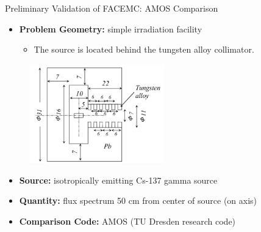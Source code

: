 \documentclass{beamer}
\begin{document}
\begin{frame}{Preliminary Validation of FACEMC: AMOS Comparison}

  \begin{itemize}
    \item \textbf{Problem Geometry:} simple irradiation facility
      \begin{itemize}
        \item The source is located behind the tungsten alloy collimator.
      \end{itemize}
  \end{itemize}

  \begin{figure}[h!]
    \begin{center}
      \includegraphics[width=2.3in]{figures/Irradiator_Facility.png}
    \end{center}
  \end{figure}

  \begin{itemize}
    \item \textbf{Source:} isotropically emitting Cs-137 gamma source
      \medskip
    \item \textbf{Quantity:} flux spectrum 50 cm from center of source (on axis)
      \medskip
    \item \textbf{Comparison Code:} AMOS (TU Dresden research code)
  \end{itemize}

\end{frame}
\end{document}
